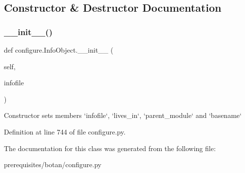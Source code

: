 \subsection{Constructor \& Destructor Documentation}
\mbox{\label{classconfigure_1_1_info_object_a1bd87b98b6c42e69a04d6294a1452577}} 
\subsubsection{\texorpdfstring{\+\_\+\+\_\+init\+\_\+\+\_\+()}{\_\_init\_\_()}}
{\footnotesize\ttfamily def configure.\+Info\+Object.\+\_\+\+\_\+init\+\_\+\+\_\+ (\begin{DoxyParamCaption}\item[{}]{self,  }\item[{}]{infofile }\end{DoxyParamCaption})}

\begin{DoxyVerb}Constructor sets members `infofile`, `lives_in`, `parent_module` and `basename`
\end{DoxyVerb}
 

Definition at line 744 of file configure.\+py.



The documentation for this class was generated from the following file\+:\begin{DoxyCompactItemize}
\item 
prerequisites/botan/configure.\+py\end{DoxyCompactItemize}
